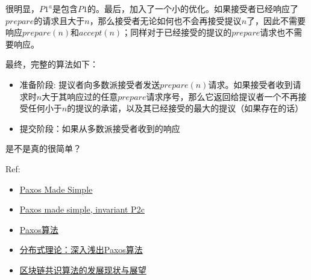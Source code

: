 \documentclass[12pt]{article}
\begin{document}
很明显，\(P1^{a}\)是包含\(P1\)的。最后，加入了一个小的优化。如果接受者已经响应了\(prepare\)的请求且大于\(n\)，那么接受者无论如何也不会再接受提议\(n\)了，因此不需要响应\(prepare(n)\)和\(accept(n)\)；同样对于已经接受的提议的\(prepare\)请求也不需要响应。

最终，完整的算法如下：

\begin{itemize}
\tightlist
\item
  准备阶段: 提议者向多数派接受者发送\(prepare(n)\)请求。如果接受者收到请求时\(n\)大于其响应过的任意\(prepare\)请求序号，那么它返回给提议者一个不再接受任何小于\(n\)的提议的承诺，以及其已经接受的最大的提议（如果存在的话）
\item
  提交阶段：如果从多数派接受者收到的响应
\end{itemize}

是不是真的很简单？

Ref:

\begin{itemize}
\tightlist
\item
  \href{https://lamport.azurewebsites.net/pubs/paxos-simple.pdf}{Paxos Made Simple}
\item
  \href{https://cstheory.stackexchange.com/questions/33504/paxos-made-simple-invariant-p2c}{Paxos made simple, invariant P2c}
\item
  \href{https://zh.wikipedia.org/wiki/Paxos\%E7\%AE\%97\%E6\%B3\%95}{Paxos算法}
\item
  \href{https://cloud.tencent.com/developer/article/1380841}{分布式理论：深入浅出Paxos算法}
\item
  \href{http://www.impcia.net/Uploads/image/file/20190712/20190712110112_58958.pdf}{区块链共识算法的发展现状与展望}
\end{itemize}
\end{document}
